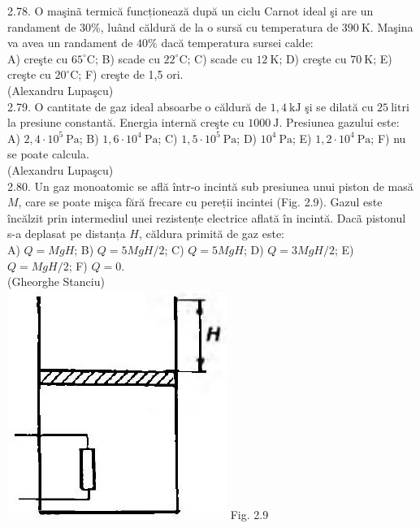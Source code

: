 2.78. O maşinã termică funcționează după un ciclu Carnot ideal şi are un randament de $30 \%$, luând căldură de la o sursă cu temperatura de $390 \mathrm{~K}$. Maşina va avea un randament de $40 \%$ dacă temperatura sursei calde:\\ A) creşte cu $65^{\circ} \mathrm{C}$; B) scade cu $22^{\circ} \mathrm{C}$; C) scade cu $12 \mathrm{~K}$; D) creşte cu $70 \mathrm{~K}$; E) creşte cu $20^{\circ} \mathrm{C}$; F) creşte de 1,5 ori.\\ (Alexandru Lupaşcu)\\

2.79. O cantitate de gaz ideal absoarbe o căldură de $1,4 \mathrm{~kJ}$ şi se dilată cu $25 \mathrm{~litri}$ la presiune constantă. Energia internă creşte cu $1000 \mathrm{~J}$. Presiunea gazului este:\\ A) $2,4 \cdot 10^{5} \mathrm{~Pa}$; B) $1,6 \cdot 10^{4} \mathrm{~Pa}$; C) $1,5 \cdot 10^{5} \mathrm{~Pa}$; D) $10^{4} \mathrm{~Pa}$; E) $1,2 \cdot 10^{4} \mathrm{~Pa}$; F) nu se poate calcula.\\ (Alexandru Lupaşcu)\\

2.80. Un gaz monoatomic se află într-o incintă sub presiunea unui piston de masă $M$, care se poate mişca fără frecare cu pereții incintei (Fig. 2.9). Gazul este încălzit prin intermediul unei rezistențe electrice aflată în incintă. Dacã pistonul s-a deplasat pe distanța $H$, căldura primită de gaz este:\\ A) $Q=M g H$; B) $Q=5 M g H / 2$; C) $Q=5 M g H$; D) $Q=3 M g H / 2$; E) $Q=M g H / 2$; F) $Q=0$.\\ (Gheorghe Stanciu)\\ \includegraphics[width=0.4\linewidth]{images/2025_07_01_5b3ff9fa0d508c8e9f17g-090} Fig. 2.9\\

